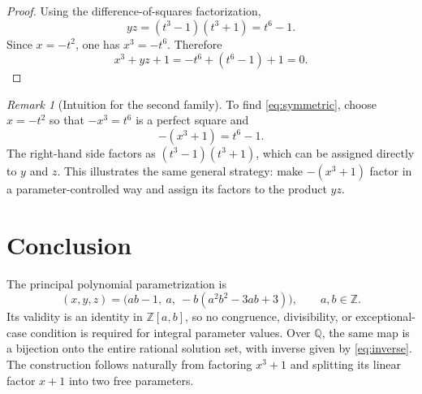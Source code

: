 \documentclass[11pt]{article}
\theoremstyle{remark}
\newtheorem{remark}[theorem]{Remark}
\newcommand{\Z}{\mathbb{Z}}
\newcommand{\Q}{\mathbb{Q}}
\begin{document}
\begin{proof}
Using the difference-of-squares factorization,
\[
 yz=(t^3-1)(t^3+1)=t^6-1.
\]
Since $x=-t^2$, one has $x^3=-t^6$.  Therefore
\[
 x^3+yz+1=-t^6+(t^6-1)+1=0.
\]
\end{proof}

\begin{remark}[Intuition for the second family]
To find \eqref{eq:symmetric}, choose $x=-t^2$ so that $-x^3=t^6$ is a
perfect square and
\[
 -(x^3+1)=t^6-1.
\]
The right-hand side factors as $(t^3-1)(t^3+1)$, which can be assigned
directly to $y$ and $z$.  This illustrates the same general strategy:
make $-(x^3+1)$ factor in a parameter-controlled way and assign its
factors to the product $yz$.
\end{remark}

\section{Conclusion}

The principal polynomial parametrization is
\[
 \boxed{
 (x,y,z)=
 \bigl(ab-1,\ a,\ -b(a^2b^2-3ab+3)\bigr),
 \qquad a,b\in\Z.}
\]
Its validity is an identity in $\Z[a,b]$, so no congruence,
divisibility, or exceptional-case condition is required for integral
parameter values.  Over $\Q$, the same map is a bijection onto the
entire rational solution set, with inverse given by
\eqref{eq:inverse}.  The construction follows naturally from
factoring $x^3+1$ and splitting its linear factor $x+1$ into two free
parameters.
\end{document}
